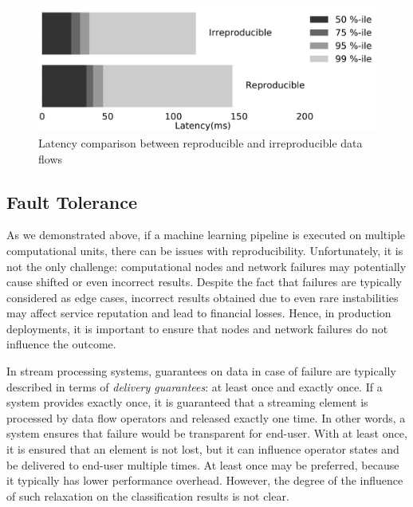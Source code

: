 \begin{figure}[htbp]
  \centering
  \includegraphics[scale=0.09]{pics/reproducibility}
  \caption{Latency comparison between reproducible and irreproducible data flows}
  \label {reproducibility}
\end{figure}

\subsection{Fault Tolerance}

As we demonstrated above, if a machine learning pipeline is executed on multiple computational units, there can be issues with reproducibility. Unfortunately, it is not the only challenge: computational nodes and network failures may potentially cause shifted or even incorrect results. Despite the fact that failures are typically considered as edge cases, incorrect results obtained due to even rare instabilities may affect service reputation and lead to financial losses. Hence, in production deployments, it is important to ensure that nodes and network failures do not influence the outcome.

In stream processing systems, guarantees on data in case of failure are typically described in terms of {\em delivery guarantees}: at least once and exactly once. If a system provides exactly once, it is guaranteed that a streaming element is processed by data flow operators and released exactly one time. In other words, a system ensures that failure would be transparent for end-user. With at least once, it is ensured that an element is not lost, but it can influence operator states and be delivered to end-user multiple times. At least once may be preferred, because it typically has lower performance overhead. However, the degree of the influence of such relaxation on the classification results is not clear.

